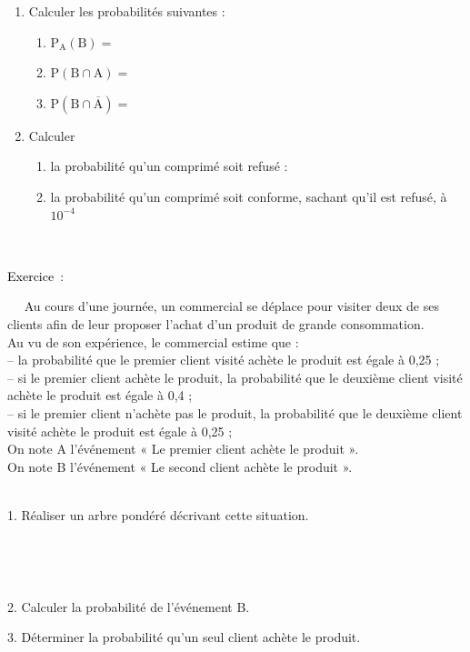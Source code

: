 \documentclass[11pt,a4paper]{article}
\newcounter{numexos}%
\newcommand{\exercice}[1]{%
\addtocounter{numexos}{1}%
\textcolor{black}{\normalsize Exercice\,\thenumexos\,}\,#1%
}
\newcommand{\bex}[2]
{\begin{bclogo}[couleur = white,logo= , barre=none,  arrondi = 0.1]
{~\exercice:~~{#1}}
~~
{#2}
~~
\end{bclogo}}
\newcommand{\cadre}[1]
{\begin{bclogo}[couleur = white,logo=,  arrondi = 0.1,barre=none]
~~
{%
\rule{0mm}{#1mm}}\par
\medskip
~~
\end{bclogo}}
\begin{document}
\begin{enumerate}
 \item Calculer les probabilités suivantes :
 \begin{enumerate}
     \item $\mathrm{P_A(B)}=$ \dotfill 
     \vspace{3mm}
     \item $\mathrm{P(B \cap A)}=$ \dotfill 
     \vspace{3mm}
     \item $\mathrm{P(B \cap \overline{A})}=$ \dotfill 
 \end{enumerate}

 \item Calculer

  \begin{enumerate}
      \item la probabilité qu'un comprimé soit refusé : \dotfill 

      \vspace{3mm}

      \item la probabilité qu'un comprimé soit conforme, sachant qu'il est refusé, à $10^{-4}$

       \vspace{1mm}
       \dotfill 
       
      
  \end{enumerate}

\end{enumerate}


\bex{}{
Au cours d’une journée, un commercial se déplace pour visiter deux de ses clients afin de leur proposer l’achat d’un produit
de grande consommation.\\
Au vu de son expérience, le commercial estime que : \\
– la probabilité que le premier client visité achète le produit est égale à 0,25 ; \\
– si le premier client achète le produit, la probabilité que le deuxième client visité achète le produit est égale à 0,4 ; \\
– si le premier client n’achète pas le produit, la probabilité que le deuxième client visité achète le produit est égale à 0,25 ; \\
On note A l’événement « Le premier client achète le produit ». \\ 
On note B l’événement « Le second client achète le produit ». \\
}

1. Réaliser un arbre pondéré décrivant cette situation.
\begin{center}

    \begin{minipage}{7cm}
     \cadre{20}
     \end{minipage}
             
    \end{center}

2. Calculer la probabilité de l’événement B. \dotfill 

\vspace{2mm}
3. Déterminer la probabilité qu’un seul client achète le produit. 
\dotfill 
\end{document}
